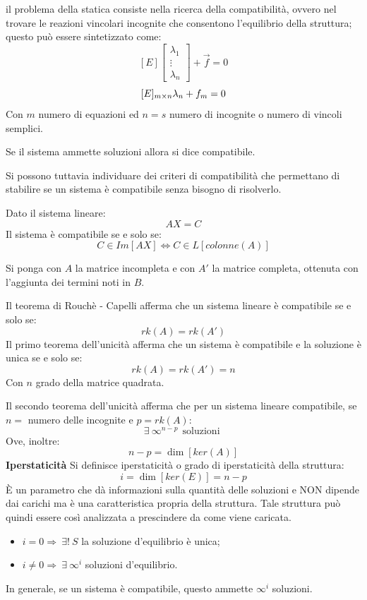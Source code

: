 \documentclass{article}
\begin{document}
\begin{adjustwidth}{2in}{}
il problema della statica consiste nella ricerca della compatibilità, ovvero nel trovare le reazioni vincolari incognite che consentono l'equilibrio della struttura; questo può essere sintetizzato come:
\[
[E]\left[ \begin{array}{c}
	\lambda_{1} \\
	\vdots \\
	\lambda_{n}
\end{array}\right] + \vec{f} = 0 
\]
\[
[E]_{\tiny{m \times n}}\lambda_{n} + f_{m} = 0
\]
Con $m$ numero di equazioni ed $n = s$ numero di incognite o numero di vincoli semplici.


Se il sistema ammette soluzioni allora si dice compatibile.


Si possono tuttavia individuare dei criteri di compatibilità che permettano di stabilire se un sistema è compatibile
senza bisogno di risolverlo. \newline


Dato il sistema lineare:
\[AX=C\]
Il sistema è compatibile se e solo se:
\[C \in Im[AX] \Leftrightarrow C \in L[colonne(A)]\]

Si ponga con $A$ la matrice incompleta e con $A'$ la matrice completa, ottenuta con l'aggiunta dei termini noti in $B$.

Il teorema di Rouchè - Capelli afferma che un sistema lineare è compatibile se e solo se:
\[rk(A) = rk(A')\]
Il primo teorema dell'unicità afferma che un sistema è compatibile e la soluzione è unica se e solo se: 
\[rk(A) = rk(A') = n\]
Con $n$ grado della matrice quadrata. 

Il secondo teorema dell'unicità afferma che per un sistema lineare compatibile, se $n=$ numero delle incognite e $p = rk(A)$:
\[\exists ~ \infty^{n-p} ~~ \text{soluzioni }\]
Ove, inoltre: 
\[n-p = \dim\left[ker(A) \right] \]
\newpage
{\Large \textbf{Iperstaticità}} \mbox{} \newline
Si definisce iperstaticità o grado di iperstaticità della struttura: 
\[ i = \dim[ker(E)] = n - p\]
È un parametro che dà informazioni sulla quantità delle soluzioni e  NON dipende dai carichi ma è una caratteristica propria della struttura. Tale struttura può quindi essere così analizzata a prescindere da come viene caricata.
\begin{itemize}
\item $i=0 \Rightarrow ~ \exists! ~S$ la soluzione d'equilibrio è unica;
\item $i \ne 0 \Rightarrow ~ \exists ~ \infty^i$ soluzioni d'equilibrio.
\end{itemize}
In generale, se un sistema è compatibile, questo ammette $\infty^i$ soluzioni.


\end{adjustwidth}
\end{document}
